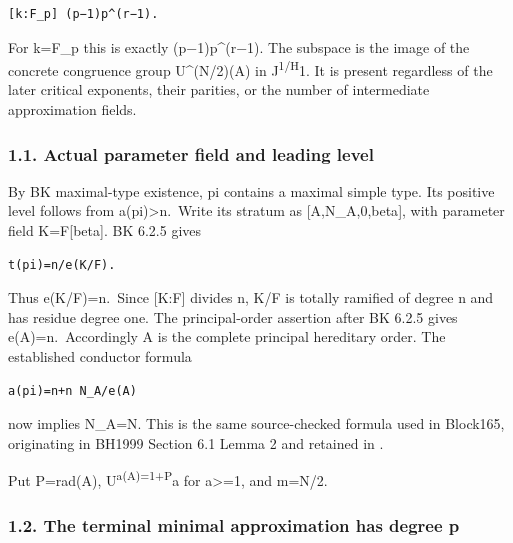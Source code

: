 \begin{Verbatim}[fontsize=\small,breaklines=true,breakanywhere=true]
[k:F_p] (p−1)p^(r−1).
\end{Verbatim}

For k=F\_p this is exactly (p−1)p\^{}(r−1). The subspace is the image of
the concrete congruence group U\^{}(N/2)(A) in J\textsuperscript{1/H}1.
It is present regardless of the later critical exponents, their
parities, or the number of intermediate approximation fields.

\hypertarget{odd_capacity-actual-parameter-field-and-leading-level}{%
\subsubsection{1.1. Actual parameter field and leading
level}\label{odd_capacity-actual-parameter-field-and-leading-level}}

By BK maximal-type existence, pi contains a maximal simple type. Its
positive level follows from a(pi)\textgreater n.~Write its stratum as
{[}A,N\_A,0,beta{]}, with parameter field K=F{[}beta{]}. BK 6.2.5 gives

\begin{Verbatim}[fontsize=\small,breaklines=true,breakanywhere=true]
t(pi)=n/e(K/F).
\end{Verbatim}

Thus e(K/F)=n.~Since {[}K:F{]} divides n, K/F is totally ramified of
degree n and has residue degree one. The principal-order assertion after
BK 6.2.5 gives e(A)=n.~Accordingly A is the complete principal
hereditary order. The established conductor formula

\begin{Verbatim}[fontsize=\small,breaklines=true,breakanywhere=true]
a(pi)=n+n N_A/e(A)
\end{Verbatim}

now implies N\_A=N. This is the same source-checked formula used in
Block165, originating in BH1999 Section 6.1 Lemma 2 and retained in
.

Put P=rad(A), U\textsuperscript{a(A)=1+P}a for a\textgreater=1, and
m=N/2.

\hypertarget{odd_capacity-the-terminal-minimal-approximation-has-degree-p}{%
\subsubsection{1.2. The terminal minimal approximation has degree
p}\label{odd_capacity-the-terminal-minimal-approximation-has-degree-p}}

